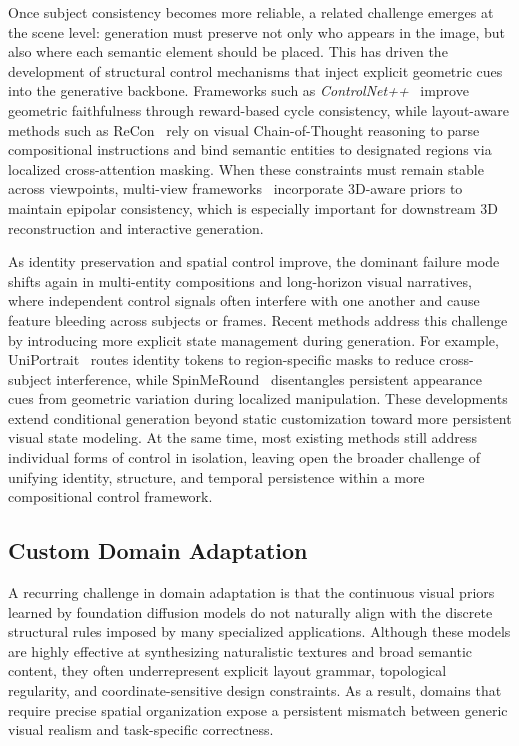 Once subject consistency becomes more reliable, a related challenge emerges at the scene level: generation must preserve not only who appears in the image, but also where each semantic element should be placed. This has driven the development of structural control mechanisms that inject explicit geometric cues into the generative backbone. Frameworks such as \textit{ControlNet++}~\citep{controlnet++} improve geometric faithfulness through reward-based cycle consistency, while layout-aware methods such as ReCon~\citep{ReCon} rely on visual Chain-of-Thought reasoning to parse compositional instructions and bind semantic entities to designated regions via localized cross-attention masking. When these constraints must remain stable across viewpoints, multi-view frameworks~\citep{FlexGen, PRISM} incorporate 3D-aware priors to maintain epipolar consistency, which is especially important for downstream 3D reconstruction and interactive generation.


As identity preservation and spatial control improve, the dominant failure mode shifts again in multi-entity compositions and long-horizon visual narratives, where independent control signals often interfere with one another and cause feature bleeding across subjects or frames. Recent methods address this challenge by introducing more explicit state management during generation. For example, UniPortrait~\citep{UniPortrait} routes identity tokens to region-specific masks to reduce cross-subject interference, while SpinMeRound~\citep{SpinMeRound} disentangles persistent appearance cues from geometric variation during localized manipulation. These developments extend conditional generation beyond static customization toward more persistent visual state modeling. At the same time, most existing methods still address individual forms of control in isolation, leaving open the broader challenge of unifying identity, structure, and temporal persistence within a more compositional control framework.



\subsection{Custom Domain Adaptation}

\label{subsec:custom_domain}



A recurring challenge in domain adaptation is that the continuous visual priors learned by foundation diffusion models do not naturally align with the discrete structural rules imposed by many specialized applications. Although these models are highly effective at synthesizing naturalistic textures and broad semantic content, they often underrepresent explicit layout grammar, topological regularity, and coordinate-sensitive design constraints. As a result, domains that require precise spatial organization expose a persistent mismatch between generic visual realism and task-specific correctness.


